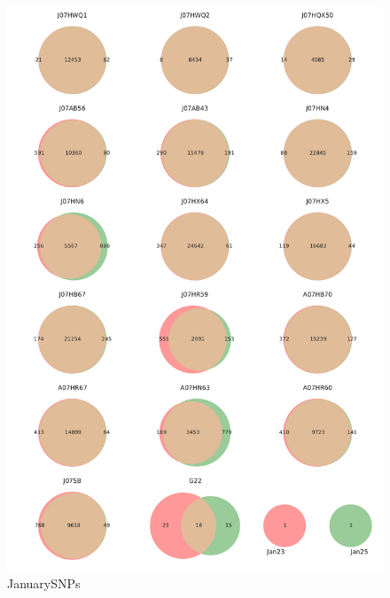 \begin{figure}[!hbtp]
  \centering
  \includegraphics[width=\textwidth]{Chapter5/Figures/Venn_JanuarySNPs.pdf}
  \caption{JanuarySNPs}
  \label{VennJan}
\end{figure}

